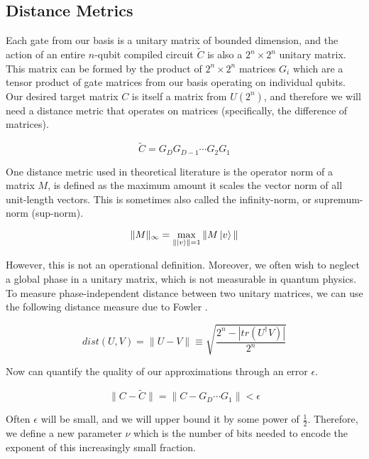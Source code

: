 \subsection{Distance Metrics}
\label{subsec:distance}

Each gate from our basis is a unitary matrix of bounded dimension, and the action of an entire
$n$-qubit compiled circuit $\tilde{C}$
is also a $2^n \times 2^n$ unitary matrix. This matrix can be formed
by the product of $2^n \times 2^n$ matrices $G_i$ which are a tensor
product of gate matrices from our basis operating on individual qubits.
Our desired target matrix $C$ is itself
a matrix from $U(2^n)$, and therefore we will need a distance metric
that operates on matrices (specifically, the difference of matrices).

\begin{equation}
\tilde{C} = G_{D}G_{D-1}\cdots G_{2} G_{1}
\end{equation}

One distance metric used in theoretical literature
is the operator norm of a matrix $M$,
is defined as the maximum amount it scales the vector norm
of all unit-length vectors. This is sometimes also called the
infinity-norm, or supremum-norm (sup-norm).

\begin{equation}
\| M \|_{\infty} = \max_{\| \left\vert{v}\right\rangle \| = 1} \| M \left\vert{v}\right\rangle \|
\label{eqn:op-norm}
\end{equation}

However, this is not an operational definition.
Moreover, we often wish to neglect a global phase in a unitary matrix,
which is not measurable in quantum physics. To measure phase-independent
distance between two unitary matrices, we can use the following
distance measure due to Fowler \cite{Fowler2011}.

\begin{equation}
dist(U, V) = \| U - V\| \equiv \sqrt{\frac{2^n - |tr(U^{\dag}V)|}{2^n}}
\end{equation}

Now can quantify the quality of our approximations through an
error $\epsilon$.

\begin{equation}
\| C - \tilde{C}\| = \| C -  G_D\cdots G_1 \| < \epsilon
\end{equation}

Often $\epsilon$ will be small, and we will upper bound it by some
power of $\frac{1}{2}$. Therefore, we define a
new parameter $\nu$ which is the number of bits needed to encode the exponent
of this increasingly small fraction.

